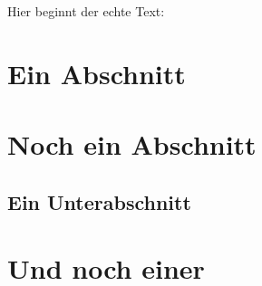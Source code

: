 \documentclass[b5paper]{scrartcl}
\begin{document}
\tableofcontents

Hier beginnt der echte Text:
\section{Ein Abschnitt}

\section{Noch ein Abschnitt}

\subsection{Ein Unterabschnitt}

\section{Und noch einer}
\end{document}
